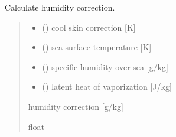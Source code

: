 \documentclass[letterpaper,10pt,english]{sphinxmanual}
\begin{document}

\begin{fulllineitems}
\label{\detokenize{users_guide:cs_wl_subs.get_dqer}}
\pysigstartsignatures
{}
\pysigstopsignatures
\sphinxAtStartPar
Calculate humidity correction.
\begin{quote}\begin{description}
\begin{itemize}
\item {} 
\sphinxAtStartPar
{} () \textendash{} cool skin correction         {[}K{]}

\item {} 
\sphinxAtStartPar
{} () \textendash{} sea surface temperature      {[}K{]}

\item {} 
\sphinxAtStartPar
{} () \textendash{} specific humidity over sea   {[}g/kg{]}

\item {} 
\sphinxAtStartPar
{} () \textendash{} latent heat of vaporization   {[}J/kg{]}

\end{itemize}

\sphinxAtStartPar
{} \textendash{} humidity correction            {[}g/kg{]}

\sphinxAtStartPar
float

\end{description}\end{quote}

\end{fulllineitems}

\end{document}
